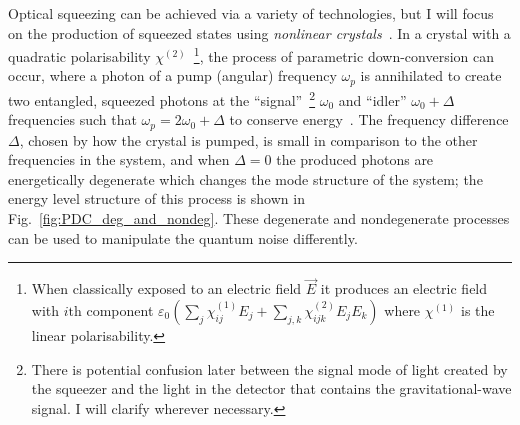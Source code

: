 Optical squeezing can be achieved via a variety of technologies, but I will focus on the production of squeezed states using \emph{nonlinear crystals}~\cite{Andersen_2016}. In a crystal with a quadratic polarisability $\chi^{(2)}$~\footnote{When classically exposed to an electric field $\vec E$ it produces an electric field with $i\text{th}$ component $\varepsilon_0 (\sum_j \chi_{ij}^{(1)} E_j + \sum_{j,k} \chi_{ijk}^{(2)} E_j E_k)$ where $\chi^{(1)}$ is the linear polarisability.}, the process of parametric down-conversion can occur, where a photon of a pump (angular) frequency $\omega_p$ is annihilated to create two entangled, squeezed photons at the ``signal''~\footnote{There is potential confusion later between the signal mode of light created by the squeezer and the light in the detector that contains the gravitational-wave signal. I will clarify wherever necessary.} $\omega_0$ and ``idler'' $\omega_0+\Delta$ frequencies such that $\omega_p=2\omega_0+\Delta$ to conserve energy~\cite{Klyshko_1976}. The frequency difference $\Delta$, chosen by how the crystal is pumped, is small in comparison to the other frequencies in the system, and when $\Delta=0$ the produced photons are energetically degenerate which changes the mode structure of the system; the energy level structure of this process is shown in Fig.~\ref{fig:PDC_deg_and_nondeg}. %
These degenerate and nondegenerate processes can be used to manipulate the quantum noise differently. %



